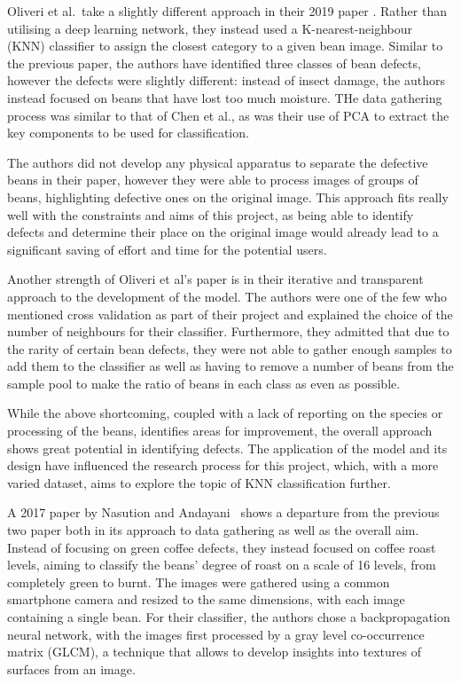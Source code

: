 Oliveri et al.\  take a slightly different approach in their 2019 paper \cite{hyperspectralGreenOliveri}.
Rather than utilising a deep learning network, they instead used a K-nearest-neighbour (KNN) classifier to assign the closest
category to a given bean image.
Similar to the previous paper, the authors have identified three classes of bean defects, however the defects were slightly different:
instead of insect damage, the authors instead focused on beans that have lost too much moisture.
THe data gathering process was similar to that of Chen et al., as was their use of PCA to extract the key components
to be used for classification.

The authors did not develop any physical apparatus to separate the defective beans in their paper, however
they were able to process images of groups of beans, highlighting defective ones on the original image.
This approach fits really well with the constraints and aims of this project, as being able to identify defects and
determine their place on the original image would already lead to a significant saving of effort and time for the potential users.

Another strength of Oliveri et al's paper is in their iterative and transparent approach to the development of the model.
The authors were one of the few who mentioned cross validation as part of their project and explained the choice of the number
of neighbours for their classifier.
Furthermore, they admitted that due to the rarity of certain bean defects, they were not able to gather enough samples
to add them to the classifier as well as having to remove a number of beans from the sample pool to make the ratio of beans
in each class as even as possible.

While the above shortcoming, coupled with a lack of reporting on the species or processing of the beans, identifies areas for
improvement, the overall approach shows great potential in identifying defects.
The application of the model and its design have influenced the research process for this project, which,
with a more varied dataset, aims to explore the topic of KNN classification further.

A 2017 paper by Nasution and Andayani~\cite{manyRoastLevelsNasution} shows a departure from the previous two paper both
in its approach to data gathering as well as the overall aim.
Instead of focusing on green coffee defects, they instead focused on coffee roast levels, aiming to classify the beans'
degree of roast on a scale of 16 levels, from completely green to burnt.
The images were gathered using a common smartphone camera and resized to the same dimensions,
with each image containing a single bean.
For their classifier, the authors chose a backpropagation neural network, with the images first processed by a
gray level co-occurrence matrix (GLCM), a technique that allows to develop insights into textures of surfaces from an image.

